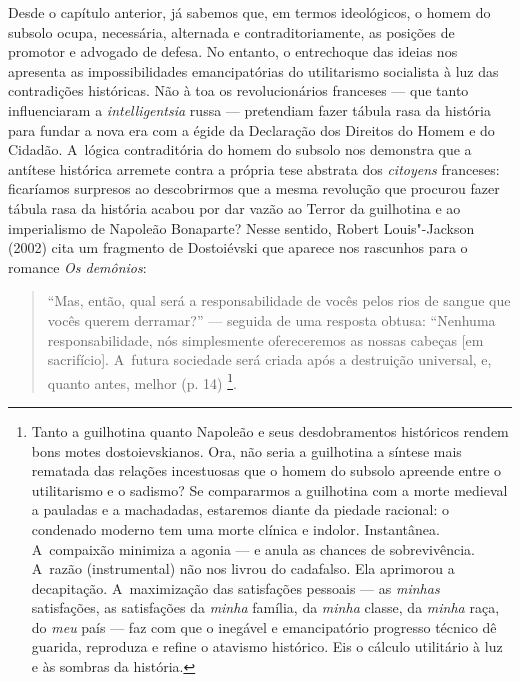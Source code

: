 Desde o capítulo anterior, já sabemos que, em termos ideológicos, o
homem do subsolo ocupa, necessária, alternada e contraditoriamente, as
posições de promotor e advogado de defesa. No entanto, o entrechoque das
ideias nos apresenta as impossibilidades emancipatórias do utilitarismo
socialista à luz das contradições históricas. Não à toa os
revolucionários franceses --- que tanto influenciaram a
\emph{intelligentsia} russa --- pretendiam fazer tábula rasa da história
para fundar a nova era com a égide da Declaração dos Direitos do Homem e
do Cidadão. A~lógica contraditória do homem do subsolo nos demonstra que
a antítese histórica arremete contra a própria tese abstrata dos
\emph{citoyens} franceses: ficaríamos surpresos ao descobrirmos que a
mesma revolução que procurou fazer tábula rasa da história acabou por
dar vazão ao Terror da guilhotina e ao imperialismo de Napoleão
Bonaparte? Nesse sentido, Robert Louis"-Jackson (2002) cita um fragmento
de Dostoiévski que aparece nos rascunhos para o romance \emph{Os
demônios}:

\begin{quote}
``Mas, então, qual será a responsabilidade de vocês pelos rios de sangue
que vocês querem derramar?'' --- seguida de uma resposta obtusa:
``Nenhuma responsabilidade, nós simplesmente ofereceremos as nossas
cabeças {[}em sacrifício{]}. A~futura sociedade será criada após a
destruição universal, e, quanto antes, melhor (p. 14) \footnote{Tanto a
  guilhotina quanto Napoleão e seus desdobramentos históricos rendem
  bons motes dostoievskianos. Ora, não seria a guilhotina a síntese mais
  rematada das relações incestuosas que o homem do subsolo apreende
  entre o utilitarismo e o sadismo? Se compararmos a guilhotina com a
  morte medieval a pauladas e a machadadas, estaremos diante da piedade
  racional: o condenado moderno tem uma morte clínica e indolor.
  Instantânea. A~compaixão minimiza a agonia --- e anula as chances de
  sobrevivência. A~razão (instrumental) não nos livrou do cadafalso. Ela
  aprimorou a decapitação. A~maximização das satisfações pessoais --- as
  \emph{minhas} satisfações, as satisfações da \emph{minha} família, da
  \emph{minha} classe, da \emph{minha} raça, do \emph{meu} país --- faz
  com que o inegável e emancipatório progresso técnico dê guarida,
  reproduza e refine o atavismo histórico. Eis o cálculo utilitário à
  luz e às sombras da história.}.
\end{quote}

